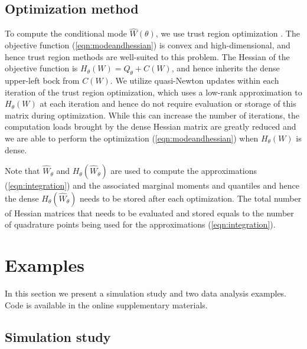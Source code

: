 \documentclass[serif,10pt]{wiley-article}
\begin{document}
\subsection{Optimization method}\label{subsec:opt}

To compute the conditional mode $\hat{W}(\theta)$, we use trust region optimization \cite{trustoptim}. The objective function (\ref{eqn:modeandhessian}) is convex and high-dimensional, and hence trust region methods are well-suited to this problem. The Hessian of the objective function is $H_{\theta}(W) = Q_{\theta} + C(W)$, and hence inherits the dense upper-left bock from $C(W)$. We utilize quasi-Newton updates within each iteration of the trust region optimization, which uses a low-rank approximation to $H_{\theta}(W)$ at each iteration and hence do not require evaluation or storage of this matrix during optimization. While this can increase the number of iterations, the computation loads brought by the dense Hessian matrix are greatly reduced and we are able to perform the optimization (\ref{eqn:modeandhessian}) when $H_{\theta}(W)$ is dense. 

Note that $\widehat{W}_{\theta}$ and $H_{\theta}(\widehat{W}_{\theta})$ are used to compute the approximations (\ref{eqn:integration}) and the associated marginal moments and quantiles and hence the dense $H_{\theta}(\widehat{W}_{\theta})$ needs to be stored after each optimization. The total number of Hessian matrices that needs to be evaluated and stored equals to the number of quadrature points being used for the approximations (\ref{eqn:integration}).



\section{Examples}\label{sec:example}

In this section we present a simulation study and two data analysis examples. Code is available in the online supplementary materials.

\subsection{Simulation study}\label{subsec:sim}
\end{document}

